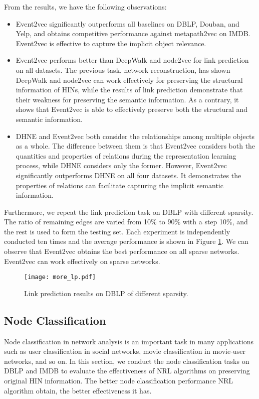 From the results, we have the following observations:
\begin{itemize}
	\item Event2vec significantly outperforms all baselines on DBLP, Douban, and Yelp, and obtains competitive performance against metapath2vec on IMDB. Event2vec is effective to capture the implicit object relevance.
	\item Event2vec performs better than DeepWalk and node2vec for link prediction on all datasets. The previous task, network reconstruction, has shown DeepWalk and node2vec can work effectively for preserving the structural information of HINs, while the results of link prediction demonstrate that their weakness for preserving the semantic information. As a contrary, it shows that Event2vec is able to effectively preserve both the structural and semantic information.
	\item DHNE and Event2vec both consider the relationships among multiple objects as a whole. The difference between them is that Event2vec considers both the quantities and properties of relations during the representation learning process, while DHNE considers only the former. However, Event2vec significantly outperforms DHNE on all four datasets. It demonstrates the properties of relations can facilitate capturing the implicit semantic information.
\end{itemize}

Furthermore, we repeat the link prediction task on DBLP with different sparsity. The ratio of remaining edges are varied from 10\% to 90\% with a step 10\%, and the rest is used to form the testing set. Each experiment is independently conducted ten times and the average performance is shown in Figure \ref{figure6}. We can observe that Event2vec obtains the best performance on all sparse networks. Event2vec can work effectively on sparse networks.

\begin{figure}
	\centering
	\texttt{[image: more\_lp.pdf]}
	\caption{{\small Link prediction results on DBLP of different sparsity.}}\label{figure6}
\end{figure}

\subsection{Node Classification}
Node classification in network analysis is an important task in many applications such as user classification in social networks, movie classification in movie-user networks, and so on. In this section, we conduct the node classification tasks on DBLP and IMDB to evaluate the effectiveness of NRL algorithms on preserving original HIN information. The better node classification performance NRL algorithm obtain, the better effectiveness it has.

